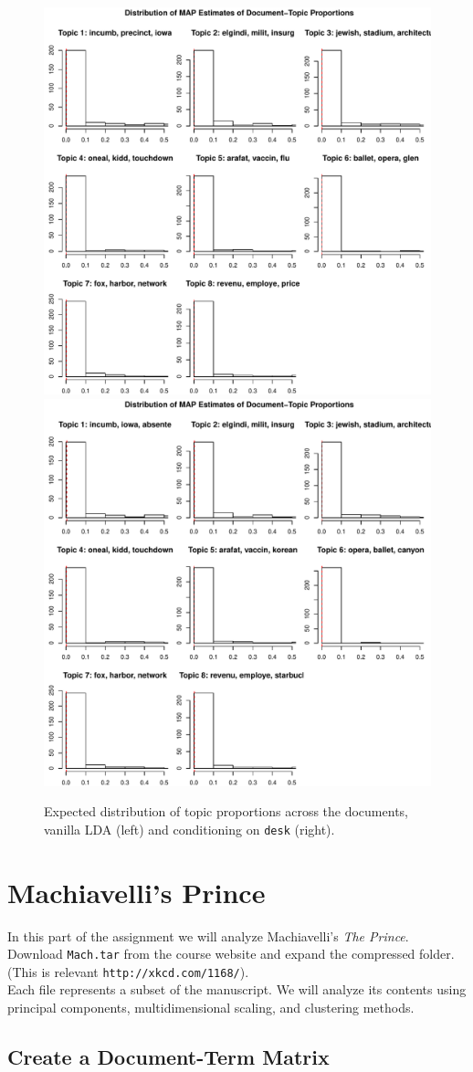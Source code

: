 \documentclass[12pt,letterpaper]{article}
\begin{document}
\begin{figure}[H]
  \caption{\footnotesize{Expected distribution of topic proportions across the documents, vanilla LDA (left) and conditioning on {\tt desk} (right).}}
  \centering
   \includegraphics[width=.49\linewidth]{HW5topicProportionsSTM.pdf}
      \includegraphics[width=.49\linewidth]{HW5topicProportionsLDA.pdf}\\
\end{figure}

\section{Machiavelli's Prince}

In this part of the assignment we will analyze Machiavelli's \emph{The Prince}.  Download {\tt Mach.tar} from the course website and expand the compressed folder.  (This is relevant {\tt http://xkcd.com/1168/}).  \\

Each file represents a subset of the manuscript.  We will analyze its contents using principal components, multidimensional scaling, and clustering methods.

\subsection*{Create a Document-Term Matrix}
\end{document}
